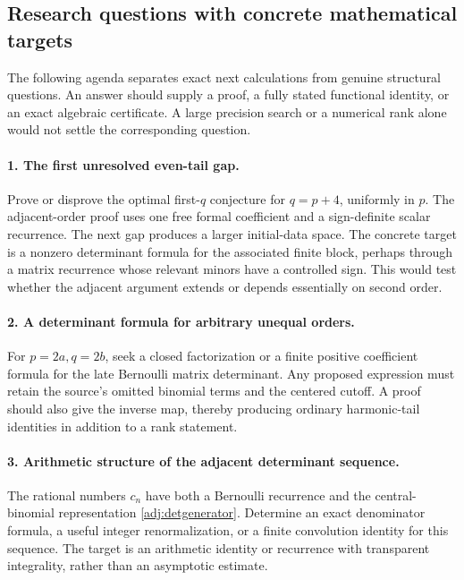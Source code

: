 \documentclass[11pt,a4paper]{article}
\numberwithin{equation}{section}
\theoremstyle{definition}
\theoremstyle{remark}
\begin{document}
\subsection{Research questions with concrete mathematical targets}

The following agenda separates exact next calculations from genuine
structural questions.  An answer should supply a proof, a fully stated
functional identity, or an exact algebraic certificate.  A large
precision search or a numerical rank alone would not settle the
corresponding question.

\paragraph{1. The first unresolved even-tail gap.}
Prove or disprove the optimal first-$q$ conjecture for
$q=p+4$, uniformly in $p$.  The adjacent-order proof uses one free
formal coefficient and a sign-definite scalar recurrence.  The next
gap produces a larger initial-data space.  The concrete target is a
nonzero determinant formula for the associated finite block, perhaps
through a matrix recurrence whose relevant minors have a controlled
sign.  This would test whether the adjacent argument extends or
depends essentially on second order.

\paragraph{2. A determinant formula for arbitrary unequal orders.}
For $p=2a,q=2b$, seek a closed factorization or a finite positive
coefficient formula for the late Bernoulli matrix determinant.
Any proposed expression must retain the source's omitted binomial
terms and the centered cutoff.  A proof should also give the inverse
map, thereby producing ordinary harmonic-tail identities in addition
to a rank statement.

\paragraph{3. Arithmetic structure of the adjacent determinant sequence.}
The rational numbers $c_n$ have both a Bernoulli recurrence and the
central-binomial representation \eqref{adj:detgenerator}.
Determine an exact denominator formula, a useful integer
renormalization, or a finite convolution identity for this sequence.
The target is an arithmetic identity or recurrence with transparent
integrality, rather than an asymptotic estimate.
\end{document}

